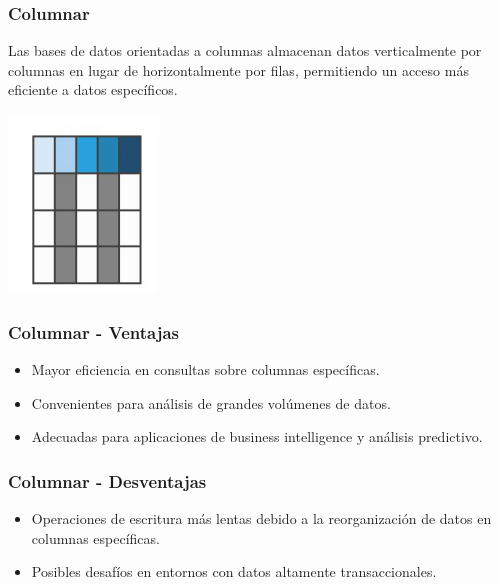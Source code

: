 \begin{frame}
    \frametitle{Columnar}

    Las bases de datos orientadas a columnas almacenan datos verticalmente por columnas en lugar de horizontalmente por filas, permitiendo un acceso más eficiente a datos específicos.
    
    \begin{center}
        \includegraphics[width=0.3\textwidth]{diagramas/Columnar.png}
    \end{center}
\end{frame}


\begin{frame}
    \frametitle{Columnar - Ventajas}

    \begin{itemize}
        \item  Mayor eficiencia en consultas sobre columnas específicas.  
        \item  Convenientes para análisis de grandes volúmenes de datos.  
        \item  Adecuadas para aplicaciones de business intelligence y análisis predictivo.
    \end{itemize}
\end{frame}

\begin{frame}
    \frametitle{Columnar - Desventajas}
    \begin{itemize}
        \item  Operaciones de escritura más lentas debido a la reorganización de datos en columnas específicas.  
        \item  Posibles desafíos en entornos con datos altamente transaccionales.
    \end{itemize}
\end{frame}

